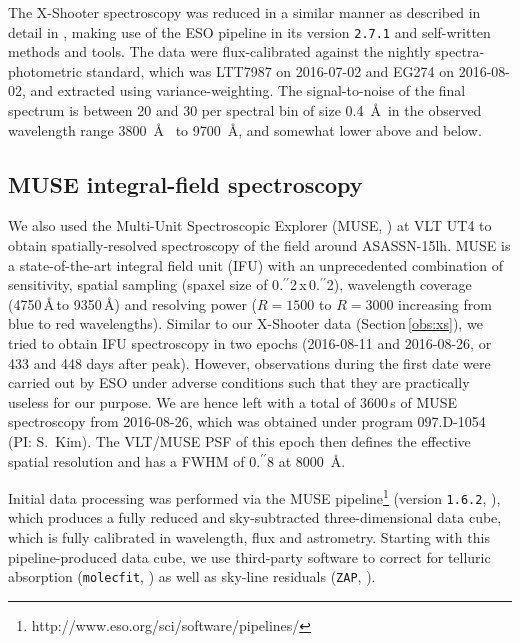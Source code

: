 \documentclass[traditabstract]{aa}
\newcommand{\farc}{\hbox{$.\!\!^{\prime\prime}$}}
\begin{document}
The X-Shooter spectroscopy was reduced in a similar manner as described in detail in \citet{2015A&A...581A.125K}, making use of the ESO pipeline in its version \texttt{2.7.1} \citep{2006SPIE.6269E..80G, 2010SPIE.7737E..56M} and self-written methods and tools. The data were flux-calibrated against the nightly spectra-photometric standard, which was LTT7987 on 2016-07-02 and EG274 on 2016-08-02, and extracted using variance-weighting. The signal-to-noise of the final spectrum is between 20 and 30 per spectral bin of size 0.4~\AA~in the observed wavelength range 3800~\AA~ to 9700~\AA, and somewhat lower above and below.

\subsection{MUSE integral-field spectroscopy}
\label{obs:muse}

We also used the Multi-Unit Spectroscopic Explorer (MUSE, \citealt{2010SPIE.7735E..08B}) at VLT UT4 to obtain spatially-resolved spectroscopy of the field around ASASSN-15lh. MUSE is a state-of-the-art integral field unit (IFU) with an unprecedented combination of sensitivity, spatial sampling (spaxel size of 0\farc{2}\,x\,0\farc{2}), wavelength coverage (4750\,\AA\,to 9350\,\AA) and resolving power ($R=1500$ to $R=3000$ increasing from blue to red wavelengths). Similar to our X-Shooter data (Section\,\ref{obs:xs}), we tried to obtain IFU spectroscopy in two epochs (2016-08-11 and 2016-08-26, or 433 and 448 days after peak). However, observations during the first date were carried out by ESO under adverse conditions such that they are practically useless for our purpose. We are hence left with a total of 3600\,s of MUSE spectroscopy from 2016-08-26, which was obtained under program 097.D-1054 (PI: S.~Kim). The VLT/MUSE PSF of this epoch then defines the effective spatial resolution and has a FWHM of 0\farc{8} at 8000~\AA.

Initial data processing was performed via the MUSE pipeline\footnote{http://www.eso.org/sci/software/pipelines/} (version \texttt{1.6.2}, \citealt{2014ASPC..485..451W}), which produces a fully reduced and sky-subtracted three-dimensional data cube, which is fully calibrated in wavelength, flux and astrometry. Starting with this pipeline-produced data cube, we use third-party software to correct for telluric absorption (\texttt{molecfit}, \citet{2015A&A...576A..77S}) as well as sky-line residuals (\texttt{ZAP}, \citealt{2016MNRAS.458.3210S}).
\end{document}
